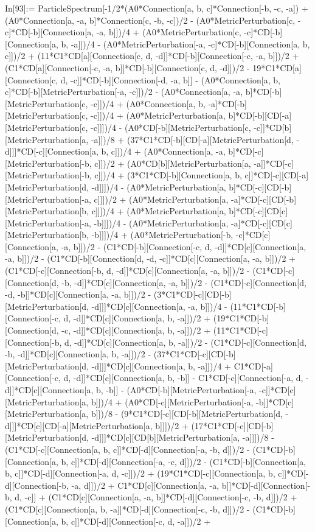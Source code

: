 In[93]:= ParticleSpectrum[-1/2*(A0*Connection[a, b, c]*Connection[-b, -c, -a]) + (A0*Connection[a, -a, b]*Connection[c, -b, -c])/2 - (A0*MetricPerturbation[c, -c]*CD[-b][Connection[a, -a, b]])/4 + (A0*MetricPerturbation[c, -c]*CD[-b][Connection[a, b, -a]])/4 - (A0*MetricPerturbation[-a, -c]*CD[-b][Connection[a, b, c]])/2 + (11*C1*CD[a][Connection[c, d, -d]]*CD[-b][Connection[-c, -a, b]])/2 + (C1*CD[a][Connection[-c, -a, b]]*CD[-b][Connection[c, d, -d]])/2 - 19*C1*CD[a][Connection[c, d, -c]]*CD[-b][Connection[-d, -a, b]] - (A0*Connection[a, b, c]*CD[-b][MetricPerturbation[-a, -c]])/2 - (A0*Connection[a, -a, b]*CD[-b][MetricPerturbation[c, -c]])/4 + (A0*Connection[a, b, -a]*CD[-b][MetricPerturbation[c, -c]])/4 + (A0*MetricPerturbation[a, b]*CD[-b][CD[-a][MetricPerturbation[c, -c]]])/4 - (A0*CD[-b][MetricPerturbation[c, -c]]*CD[b][MetricPerturbation[a, -a]])/8 + (37*C1*CD[-b][CD[-a][MetricPerturbation[d, -d]]]*CD[-c][Connection[a, b, c]])/4 + (A0*Connection[a, -a, b]*CD[-c][MetricPerturbation[-b, c]])/2 + (A0*CD[b][MetricPerturbation[a, -a]]*CD[-c][MetricPerturbation[-b, c]])/4 + (3*C1*CD[-b][Connection[a, b, c]]*CD[-c][CD[-a][MetricPerturbation[d, -d]]])/4 - (A0*MetricPerturbation[a, b]*CD[-c][CD[-b][MetricPerturbation[-a, c]]])/2 + (A0*MetricPerturbation[a, -a]*CD[-c][CD[-b][MetricPerturbation[b, c]]])/4 + (A0*MetricPerturbation[a, b]*CD[-c][CD[c][MetricPerturbation[-a, -b]]])/4 - (A0*MetricPerturbation[a, -a]*CD[-c][CD[c][MetricPerturbation[b, -b]]])/4 + (A0*MetricPerturbation[-b, -c]*CD[c][Connection[a, -a, b]])/2 - (C1*CD[-b][Connection[-c, d, -d]]*CD[c][Connection[a, -a, b]])/2 - (C1*CD[-b][Connection[d, -d, -c]]*CD[c][Connection[a, -a, b]])/2 + (C1*CD[-c][Connection[-b, d, -d]]*CD[c][Connection[a, -a, b]])/2 - (C1*CD[-c][Connection[d, -b, -d]]*CD[c][Connection[a, -a, b]])/2 - (C1*CD[-c][Connection[d, -d, -b]]*CD[c][Connection[a, -a, b]])/2 - (3*C1*CD[-c][CD[-b][MetricPerturbation[d, -d]]]*CD[c][Connection[a, -a, b]])/4 - (11*C1*CD[-b][Connection[-c, d, -d]]*CD[c][Connection[a, b, -a]])/2 + (19*C1*CD[-b][Connection[d, -c, -d]]*CD[c][Connection[a, b, -a]])/2 + (11*C1*CD[-c][Connection[-b, d, -d]]*CD[c][Connection[a, b, -a]])/2 - (C1*CD[-c][Connection[d, -b, -d]]*CD[c][Connection[a, b, -a]])/2 - (37*C1*CD[-c][CD[-b][MetricPerturbation[d, -d]]]*CD[c][Connection[a, b, -a]])/4 + C1*CD[-a][Connection[-c, d, -d]]*CD[c][Connection[a, b, -b]] - C1*CD[-c][Connection[-a, d, -d]]*CD[c][Connection[a, b, -b]] - (A0*CD[-b][MetricPerturbation[-a, -c]]*CD[c][MetricPerturbation[a, b]])/4 + (A0*CD[-c][MetricPerturbation[-a, -b]]*CD[c][MetricPerturbation[a, b]])/8 - (9*C1*CD[-c][CD[-b][MetricPerturbation[d, -d]]]*CD[c][CD[-a][MetricPerturbation[a, b]]])/2 + (17*C1*CD[-c][CD[-b][MetricPerturbation[d, -d]]]*CD[c][CD[b][MetricPerturbation[a, -a]]])/8 - (C1*CD[-c][Connection[a, b, c]]*CD[-d][Connection[-a, -b, d]])/2 - (C1*CD[-b][Connection[a, b, c]]*CD[-d][Connection[-a, -c, d]])/2 - (C1*CD[-b][Connection[a, b, c]]*CD[-d][Connection[-a, d, -c]])/2 + (19*C1*CD[-c][Connection[a, b, c]]*CD[-d][Connection[-b, -a, d]])/2 + C1*CD[c][Connection[a, -a, b]]*CD[-d][Connection[-b, d, -c]] + (C1*CD[c][Connection[a, -a, b]]*CD[-d][Connection[-c, -b, d]])/2 + (C1*CD[c][Connection[a, b, -a]]*CD[-d][Connection[-c, -b, d]])/2 - (C1*CD[-b][Connection[a, b, c]]*CD[-d][Connection[-c, d, -a]])/2 + 